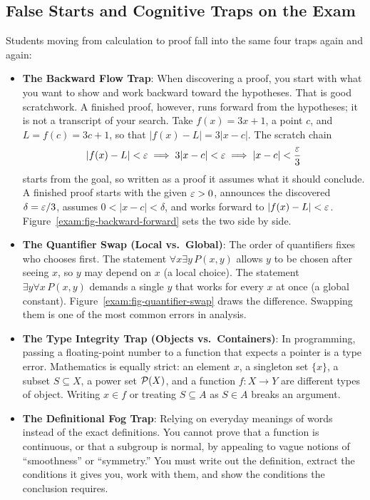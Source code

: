 \subsection{False Starts and Cognitive Traps on the Exam}

Students moving from calculation to proof fall into the same four traps again and again:

\begin{itemize}
  \item \textbf{The Backward Flow Trap}: When discovering a proof, you start with what you want to show and work backward toward the hypotheses. That is good scratchwork. A finished proof, however, runs forward from the hypotheses; it is not a transcript of your search. Take $f(x) = 3x + 1$, a point $c$, and $L = f(c) = 3c + 1$, so that $|f(x) - L| = 3|x - c|$. The scratch chain
  \[
  |f(x) - L| < \varepsilon \implies 3|x - c| < \varepsilon \implies |x - c| < \frac{\varepsilon}{3}
  \]
  starts from the goal, so written as a proof it assumes what it should conclude. A finished proof starts with the given $\varepsilon > 0$, announces the discovered $\delta = \varepsilon/3$, assumes $0 < |x - c| < \delta$, and works forward to $|f(x) - L| < \varepsilon$. Figure~\ref{exam:fig-backward-forward} sets the two side by side.
  \item \textbf{The Quantifier Swap (Local vs.\ Global)}: The order of quantifiers fixes who chooses first. The statement $\forall x \exists y \, P(x, y)$ allows $y$ to be chosen after seeing $x$, so $y$ may depend on $x$ (a local choice). The statement $\exists y \forall x \, P(x, y)$ demands a single $y$ that works for every $x$ at once (a global constant). Figure~\ref{exam:fig-quantifier-swap} draws the difference. Swapping them is one of the most common errors in analysis.
  \item \textbf{The Type Integrity Trap (Objects vs.\ Containers)}: In programming, passing a floating-point number to a function that expects a pointer is a type error. Mathematics is equally strict: an element $x$, a singleton set $\{x\}$, a subset $S \subseteq X$, a power set $\mathcal{P}(X)$, and a function $f: X \to Y$ are different types of object. Writing $x \in f$ or treating $S \subseteq A$ as $S \in A$ breaks an argument.
  \item \textbf{The Definitional Fog Trap}: Relying on everyday meanings of words instead of the exact definitions. You cannot prove that a function is continuous, or that a subgroup is normal, by appealing to vague notions of ``smoothness'' or ``symmetry.'' You must write out the definition, extract the conditions it gives you, work with them, and show the conditions the conclusion requires.
\end{itemize}

